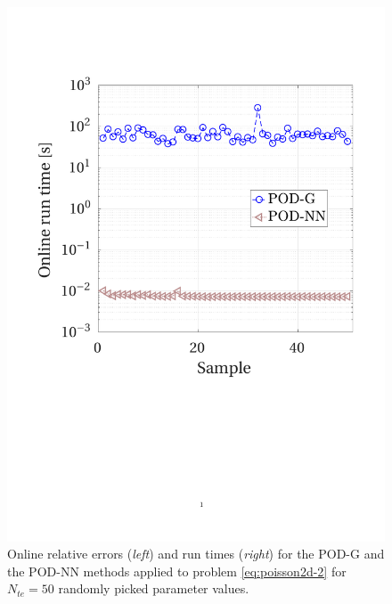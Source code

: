 \documentclass[12pt, a4paper, twoside, openright]{report}
\numberwithin{equation}{chapter}
\theoremstyle{theorem}
\theoremstyle{definition}
\theoremstyle{remark}
\theoremstyle{proposition}
\numberwithin{figure}{chapter}
\begin{document}
\begin{figure}[H]
			\includegraphics[scale = 0.4, trim = {1.5cm 8.25cm 1.5cm 3.5cm}, clip]{poisson2d_2_time}
			
			\caption{Online relative errors (\emph{left}) and run times (\emph{right}) for the POD-G and the POD-NN methods applied to problem \eqref{eq:poisson2d-2} for $N_{te} = 50$ randomly picked parameter values.}
			\label{fig:poisson2d-2-fig2}
		\end{figure}
		
\end{document}
